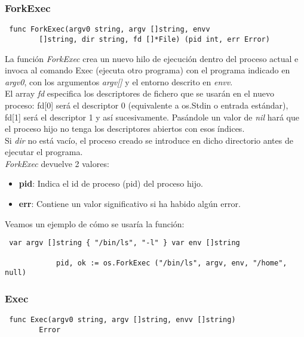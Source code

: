 		\subsubsection{ForkExec}

		\begin{verbatim} func ForkExec(argv0 string, argv []string, envv
		[]string, dir string, fd []*File) (pid int, err Error) \end{verbatim}
				
		La función \textit{ForkExec} crea un nuevo hilo de ejecución dentro del
		proceso actual e invoca al comando Exec (ejecuta otro programa) con el
		programa indicado en \textit{argv0}, con los argumentos \textit{argv[]}
		y el entorno descrito en \textit{envv}.\\
		
		El array \textit{fd} especifica los descriptores de fichero que se
		usarán en el nuevo proceso: fd[0] será el descriptor 0 (equivalente
		a os.Stdin o entrada estándar), fd[1] será el descriptor 1 y así
		sucesivamente. Pasándole un valor de \textit{nil} hará que el proceso
		hijo no tenga los descriptores abiertos con esos índices.\\
		
		Si \textit{dir} no está vacío, el proceso creado se introduce en dicho
		directorio antes de ejecutar el programa.\\
		
		\textit{ForkExec} devuelve 2 valores: \begin{itemize} \item
		\textbf{pid}: Indica el id de proceso (pid) del proceso hijo.  \item
		\textbf{err}: Contiene un valor significativo si ha habido algún error.
		\end{itemize}
		
		Veamos un ejemplo de cómo se usaría la función:
		
		\begin{verbatim} var argv []string { "/bin/ls", "-l" } var env []string
		
			pid, ok := os.ForkExec ("/bin/ls", argv, env, "/home", null)
			\end{verbatim}
		
		\subsubsection{Exec}

		\begin{verbatim} func Exec(argv0 string, argv []string, envv []string)
		Error \end{verbatim}
				
